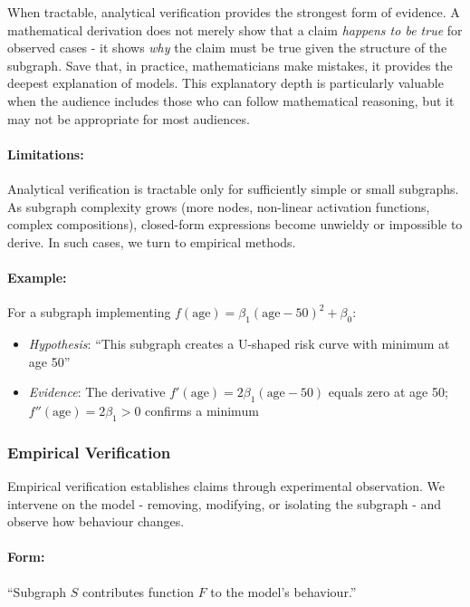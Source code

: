 \documentclass{article}
\begin{document}
When tractable, analytical verification provides the strongest form of evidence. A mathematical derivation does not merely show that a claim \emph{happens to be true} for observed cases - it shows \emph{why} the claim must be true given the structure of the subgraph. Save that, in practice, mathematicians make mistakes, it provides the deepest explanation of models. This explanatory depth is particularly valuable when the audience includes those who can follow mathematical reasoning, but it may not be appropriate for most audiences.

\paragraph{Limitations:} Analytical verification is tractable only for sufficiently simple or small subgraphs. As subgraph complexity grows (more nodes, non-linear activation functions, complex compositions), closed-form expressions become unwieldy or impossible to derive. In such cases, we turn to empirical methods.

\paragraph{Example:} For a subgraph implementing $f(\text{age}) = \beta_1(\text{age} - 50)^2 + \beta_0$:
\begin{itemize}
    \item \emph{Hypothesis}: ``This subgraph creates a U-shaped risk curve with minimum at age 50''
    \item \emph{Evidence}: The derivative $f'(\text{age}) = 2\beta_1(\text{age} - 50)$ equals zero at age 50; $f''(\text{age}) = 2\beta_1 > 0$ confirms a minimum
\end{itemize}

\subsubsection{Empirical Verification}

Empirical verification establishes claims through experimental observation. We intervene on the model - removing, modifying, or isolating the subgraph - and observe how behaviour changes.

\paragraph{Form:} ``Subgraph $S$ contributes function $F$ to the model's behaviour.''
\end{document}
